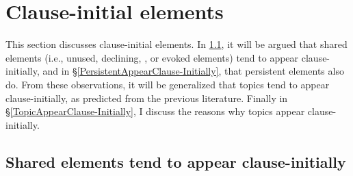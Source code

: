 \section{Clause-initial elements}\label{WOSentInitEles}

This section discusses clause-initial elements. In \ref{GivenAppearClause-Initially}, it will be argued that shared elements (i.e., unused, declining, , or evoked elements) tend to appear clause-initially, and in \S \ref{PersistentAppearClause-Initially}, that persistent elements also do.  
From these observations,
it will be generalized that topics tend to appear clause-initially,
as predicted from the previous literature.
Finally in \S \ref{TopicAppearClause-Initially},
I discuss the reasons why topics appear clause-initially.


\subsection{Shared elements tend to appear clause-initially}\label{GivenAppearClause-Initially}




